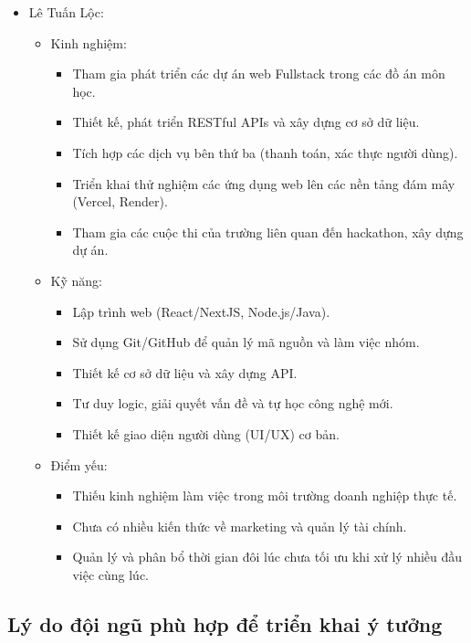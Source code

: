 \begin{itemize}
    \item Lê Tuấn Lộc:
    \begin{itemize}
        \item Kinh nghiệm:
            \begin{itemize}
                \item Tham gia phát triển các dự án web Fullstack trong các đồ án môn học.
                \item Thiết kế, phát triển RESTful APIs và xây dựng cơ sở dữ liệu.
                \item Tích hợp các dịch vụ bên thứ ba (thanh toán, xác thực người dùng).
                \item Triển khai thử nghiệm các ứng dụng web lên các nền tảng đám mây (Vercel, Render).
                \item Tham gia các cuộc thi của trường liên quan đến hackathon, xây dựng dự án.
            \end{itemize}
        \item Kỹ năng:
            \begin{itemize}
                \item Lập trình web (React/NextJS, Node.js/Java).
                \item Sử dụng Git/GitHub để quản lý mã nguồn và làm việc nhóm.
                \item Thiết kế cơ sở dữ liệu và xây dựng API.
                \item Tư duy logic, giải quyết vấn đề và tự học công nghệ mới.
                \item Thiết kế giao diện người dùng (UI/UX) cơ bản.
            \end{itemize}
        \item Điểm yếu:
            \begin{itemize}
                \item Thiếu kinh nghiệm làm việc trong môi trường doanh nghiệp thực tế.
                \item Chưa có nhiều kiến thức về marketing và quản lý tài chính.
                \item Quản lý và phân bổ thời gian đôi lúc chưa tối ưu khi xử lý nhiều đầu việc cùng lúc.
            \end{itemize}
    \end{itemize}
    
\end{itemize}

\subsection{Lý do đội ngũ phù hợp để triển khai ý tưởng}

